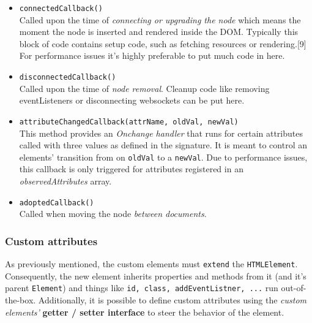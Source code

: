 \documentclass[]{assets/latex/ieee}
\providecommand{\tightlist}{%
  \setlength{\itemsep}{0pt}\setlength{\parskip}{0pt}}
\begin{document}
\begin{itemize}
\tightlist
\item
  \texttt{connectedCallback()}\\
  Called upon the time of \emph{connecting or upgrading the node} which
  means the moment the node is inserted and rendered inside the DOM.
  Typically this block of code contains setup code, such as fetching
  resources or rendering.{[}9{]} For performance issues it's highly
  preferable to put much code in here.
\item
  \texttt{disconnectedCallback()}\\
  Called upon the time of \emph{node removal}. Cleanup code like
  removing eventListeners or disconnecting websockets can be put here.
\item
  \texttt{attributeChangedCallback(attrName,\ oldVal,\ newVal)}\\
  This method provides an \emph{Onchange handler} that runs for certain
  attributes called with three values as defined in the signature. It is
  meant to control an elements' transition from on \texttt{oldVal} to a
  \texttt{newVal}. Due to performance issues, this callback is only
  triggered for attributes registered in an \emph{observedAttributes}
  array.
\item
  \texttt{adoptedCallback()}\\
  Called when moving the node \emph{between documents}.
\end{itemize}

\subsubsection{Custom attributes}\label{custom-attributes}

As previously mentioned, the custom elements must \texttt{extend} the
\texttt{HTMLElement}. Consequently, the new element inherits properties
and methods from it (and it's parent \texttt{Element}) and things like
\texttt{id,\ class,\ addEventListner,\ ...} run out-of-the-box.
Additionally, it is possible to define custom attributes using the
\emph{custom elements'} \textbf{getter / setter interface} to steer the
behavior of the element.
\end{document}
